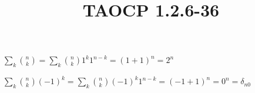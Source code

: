 \documentclass{article}
\title{TAOCP 1.2.6\mbox{-}36}
\begin{document}
\maketitle

\( \sum_{k} \binom{n}{k} = \sum_{k} \binom{n}{k} 1^{k}1^{n-k} = {(1+1)}^{n} = 2^{n} \)

\( \sum_{k} \binom{n}{k}{(-1)}^{k} = \sum_{k} \binom{n}{k} {(-1)}^{k}1^{n-k} = {(-1+1)}^{n} = 0^{n} = \delta_{n0} \)
\end{document}
